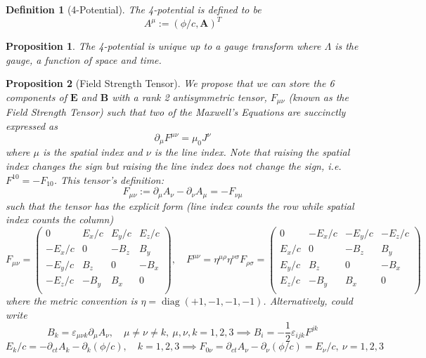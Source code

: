 \documentclass[a4paper]{article}
\DeclareMathOperator{\diag}{diag}
\theoremstyle{new}
\newtheorem{defi}{Definition}[section]
\newtheorem{prop}{Proposition}[section]
\begin{document}
\begin{defi}[4-Potential]
The 4-potential is defined to be
$$A^\mu:=(\phi/c,\mathbf{A})^T$$
\end{defi}
\begin{prop}
The 4-potential is unique up to a gauge transform where $\Lambda$ is the gauge, a function of space and time.
\end{prop}
\begin{prop}[Field Strength Tensor]
We propose that we can store the 6 components of $\mathbf{E}$ and $\mathbf{B}$ with a rank 2 antisymmetric tensor, $F_{\mu\nu}$ (known as the Field Strength Tensor) such that two of the Maxwell's Equations are succinctly expressed as
$$\partial_\mu F^{\mu\nu}=\mu_0J^\nu$$
where $\mu$ is the spatial index and $\nu$ is the line index. Note that raising the spatial index changes the sign but raising the line index does not change the sign, i.e. $F^{10}=-F_{10}$. This tensor's definition:
$$F_{\mu\nu}:=\partial_\mu A_\nu-\partial_\nu A_\mu=-F_{\nu\mu}$$
such that the tensor has the explicit form (line index counts the row while spatial index counts the column)
$$F_{\mu\nu}=\begin{pmatrix}0&E_x/c&E_y/c&E_z/c\\-E_x/c&0&-B_z&B_y\\-E_y/c&B_z&0&-B_x\\-E_z/c&-B_y&B_x&0\\\end{pmatrix},\quad F^{\mu\nu}=\eta^{\mu\rho}\eta^{\nu\sigma}F_{\rho\sigma}=\begin{pmatrix}0&-E_x/c&-E_y/c&-E_z/c\\E_x/c&0&-B_z&B_y\\E_y/c&B_z&0&-B_x\\E_z/c&-B_y&B_x&0\\\end{pmatrix}$$
where the metric convention is $\eta=\diag(+1,-1,-1,-1)$. Alternatively, could write 
$$B_k=\varepsilon_{\mu\nu k}\partial_\mu A_\nu,\quad\mu\neq\nu\neq k,~\mu,\nu,k=1,2,3\implies B_i=-\frac{1}{2}\varepsilon_{ijk}F^{jk}$$
$$E_k/c=-\partial_{ct}A_k-\partial_k(\phi/c),\quad k=1,2,3\implies F_{0\nu}=\partial_{ct}A_\nu-\partial_\nu(\phi/c)=E_\nu/c,~\nu=1,2,3$$
\end{prop}
\end{document}
